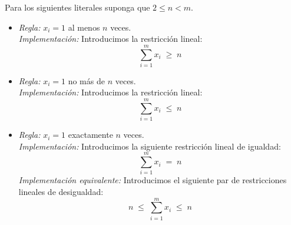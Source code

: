 \documentclass[ 10pt, xcolor = dvipsnames]{beamer}
\begin{document}
\begin{frame}[allowframebreaks]
\frametitle{\insertsection}

Para los siguientes literales suponga que $2 \leq n < m$. 
\begin{itemize}
\item \emph{Regla:} $x_i = 1$ al menos $n$ veces. \\[1ex] \emph{Implementaci\'on:} Introducimos la restricci\'on lineal: 
\[
\sum_{i=1}^m x_i \; \geq \; n
\]
\item \emph{Regla:} $x_i = 1$ no m\'as de $n$ veces. \\[1ex] \emph{Implementaci\'on:} Introducimos la restricci\'on lineal: 
\[
\sum_{i=1}^m x_i \; \leq \; n
\]
\item \emph{Regla:} $x_i = 1$ exactamente $n$ veces. \\[1ex] \emph{Implementaci\'on:} Introducimos la siguiente restricci\'on lineal de igualdad: 
\[
\sum_{i=1}^m x_i \; = \; n
\]
\emph{Implementaci\'on equivalente:} Introducimos el siguiente par de restricciones lineales de desigualdad: 
\[
n \; \leq \; \sum_{i=1}^m x_i \; \leq \; n
\]
\end{itemize}

\end{frame}
\end{document}
